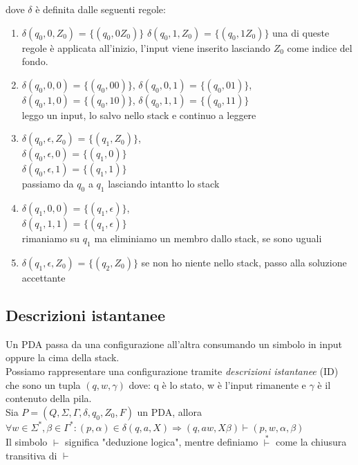 \documentclass[12pt]{article}
\begin{document}
dove $\delta$ è definita dalle seguenti regole: 
\begin{enumerate}
  \item $\delta(q_0,0,Z_0)$ = $\{(q_0, 0Z_0)\}$ 
        $\delta(q_0,1,Z_0)$ = $\{(q_0, 1Z_0)\}$ 
        una di queste regole è applicata all'inizio, l'input viene inserito lasciando $Z_0$ come indice del fondo.
  \item 
        $\delta(q_0,0,0)$ = $\{(q_0, 00)\}$,
        $\delta(q_0,0,1)$ = $\{(q_0, 01)\}$,
        \\ $\delta(q_0,1,0)$ = $\{(q_0, 10)\}$,
        $\delta(q_0,1,1)$ = $\{(q_0, 11)\}$
        \\ leggo un input, lo salvo nello stack e continuo a leggere 
  \item 
        $\delta(q_0,\epsilon,Z_0)$ = $\{(q_1, Z_0)\}$,
        \\ $\delta(q_0,\epsilon,0)$ = $\{(q_1, 0)\}$ 
        \\ $\delta(q_0,\epsilon,1)$ = $\{(q_1, 1)\}$ 
        \\ passiamo da $q_0$ a $q_1$ lasciando intantto lo stack
  \item 
        $\delta(q_1,0,0)$ = $\{(q_1, \epsilon)\}$,
        \\ $\delta(q_1,1,1)$ = $\{(q_1, \epsilon)\}$
        \\ rimaniamo su $q_1$ ma eliminiamo un membro dallo stack, se sono uguali
  \item 
        $\delta(q_1,\epsilon,Z_0)$ = $\{(q_2, Z_0)\}$
        se non ho niente nello stack, passo alla soluzione accettante

\end{enumerate}

\newpage
\subsection{Descrizioni istantanee}
Un PDA passa da una configurazione all'altra consumando un simbolo in input oppure la cima della stack.
\\ Possiamo rappresentare una configurazione tramite \emph{descrizioni istantanee} (ID) che sono un tupla $(q, w,\gamma)$ dove: q è lo stato, w è l'input rimanente e $\gamma$ è il contenuto della pila. 
\\ Sia $P=(Q,\Sigma, \Gamma, \delta, q_0, Z_0, F)$ un PDA, allora $\forall w \in \Sigma^*, \beta \in \Gamma^*: (p,\alpha) \in \delta(q,a,X) \Rightarrow (q, aw, X\beta) \vdash (p,w,\alpha, \beta)$
\\ Il simbolo $\vdash$ significa "deduzione logica", mentre definiamo $\overset{*}{\vdash}$ come la chiusura transitiva di $\vdash$ 
\end{document}

